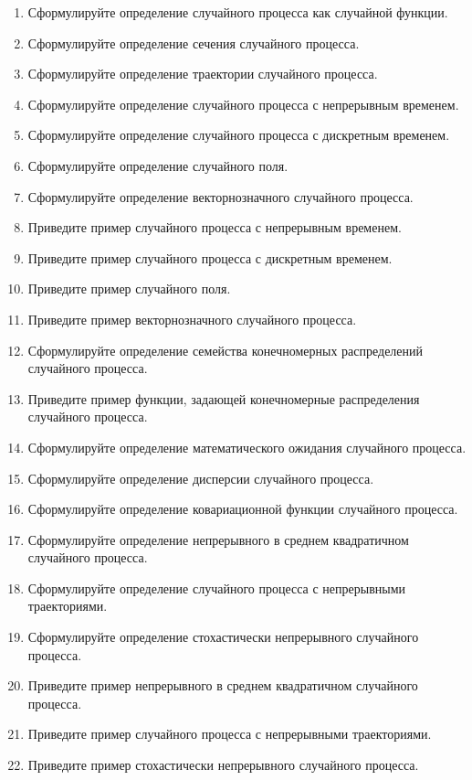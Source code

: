 \documentclass[a4paper,12pt]{extreport}
\renewcommand{\=}[1]{\stackrel{#1}{=}} %
\begin{document}
\begin{enumerate}
	\item Сформулируйте определение случайного процесса как случайной функции.
	\item Сформулируйте определение сечения случайного процесса.
	\item Сформулируйте определение траектории случайного процесса.

	\item Сформулируйте определение случайного процесса с непрерывным временем.
	\item Сформулируйте определение случайного процесса с дискретным временем.
	\item Сформулируйте определение случайного поля.
	\item Сформулируйте определение векторнозначного случайного процесса.

	\item Приведите пример случайного процесса с непрерывным временем.
	\item Приведите пример случайного процесса с дискретным временем.
	\item Приведите пример случайного поля.
	\item Приведите пример векторнозначного случайного процесса.

	\item Сформулируйте определение семейства конечномерных распределений случайного процесса.
	\item Приведите пример функции, задающей конечномерные распределения случайного процесса.

	\item Сформулируйте определение математического ожидания случайного процесса.
	\item Сформулируйте определение дисперсии случайного процесса.
	\item Сформулируйте определение ковариационной функции случайного процесса.
	
	\item Сформулируйте определение непрерывного в среднем квадратичном случайного процесса.
	\item Сформулируйте определение случайного процесса с непрерывными траекториями.
	\item Сформулируйте определение стохастически непрерывного случайного процесса.

	\item Приведите пример непрерывного в среднем квадратичном случайного процесса.
	\item Приведите пример случайного процесса с непрерывными траекториями.
	\item Приведите пример стохастически непрерывного случайного процесса.


\end{enumerate}
\end{document}
